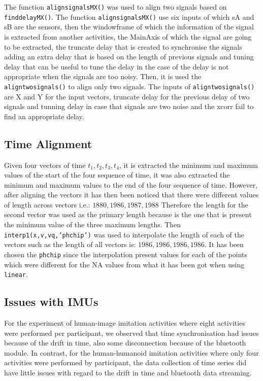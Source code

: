 The function \texttt{alignsignalsMX()} was used to align two signals based
on \texttt{finddelayMX()}. The function \texttt{alignsignalsMX()} use six inputs
of which sA and sB are the sensors, then the windowframe of which the information
of the signal is extracted from another activities, the MainAxis of which the
signal are going to be extracted, the truncate delay that is created to
synchronise the signals adding an extra delay that is based on the length of
previous signals and tuning delay that can be useful to tune the delay in the
case of the delay is not appropriate when the signals are too noisy.
Then, it is used the \texttt{aligntwosignals()} to align only two signals.
The inputs of \texttt{aligntwosignals()} are X and Y for the input vectors,
truncate delay for the previous delay of two signals and tunning delay
in case that signals are two noise and the xcorr fail to find an appropriate
delay.

\subsection{Time Alignment}
Given four vectors of time
$t_1, t_2, t_3, t_4$, it is extracted the minimum and maximum values
of the start of the four sequence of time,
it was also extracted the minimum and maximum values to the
end of the four sequence of time.
However, after aligning the vectors it has then  been noticed that there were
different values of length across vectors i.e.: $1880,1986,1987,1988$
Therefore the length for the second vector was used as the primary length
because is the one that is present the minimum value of the three maximum
lengths. Then \texttt{interp1(x,v,vq,'phchip')}  was used to interpolate the
length of each of the vectors such as the length of all vectors is: 
$1986,1986,1986,1986$.
It has been chosen the \texttt{phchip} since the interpolation present
values for each of the points which were different for the NA values
from what it has been got when using \texttt{linear}.

\subsection{Issues with IMUs} \label{appendix:imus:issues}
For the experiment of human-image imitation activities where eight activities 
were performed per participant, we observed that time synchronisation had 
issues because of the drift in time, also some disconnection because of the 
bluetooth module. In contrast, for the human-humanoid imitation activities
where only four activities were performed by participant, the data collection
of time series did have little issues with regard to the drift in time 
and bluetooth data streaming.  

